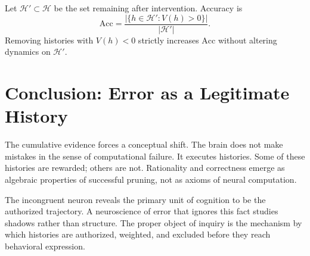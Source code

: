 \documentclass[11pt]{article}
\theoremstyle{plain}
\theoremstyle{definition}
\begin{document}
Let $\mathcal{H}'\subset\mathcal{H}$ be the set remaining after intervention. Accuracy is
\[
\mathrm{Acc}=\frac{|\{h\in\mathcal{H}':V(h)>0\}|}{|\mathcal{H}'|}.
\]
Removing histories with $V(h)<0$ strictly increases $\mathrm{Acc}$ without altering dynamics on $\mathcal{H}'$.

\section{Conclusion: Error as a Legitimate History}

The cumulative evidence forces a conceptual shift. The brain does not make mistakes in the sense of computational failure. It executes histories. Some of these histories are rewarded; others are not. Rationality and correctness emerge as algebraic properties of successful pruning, not as axioms of neural computation.

The incongruent neuron reveals the primary unit of cognition to be the authorized trajectory. A neuroscience of error that ignores this fact studies shadows rather than structure. The proper object of inquiry is the mechanism by which histories are authorized, weighted, and excluded before they reach behavioral expression.
\end{document}
